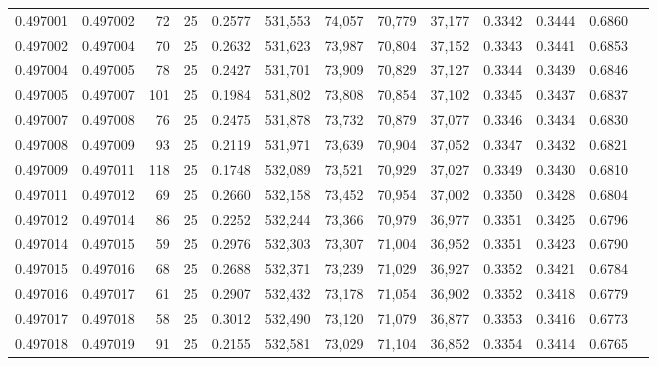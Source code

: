\begin{tabular}{rrrrrrrrrrrrr}
0.497001 & 0.497002 &    72 &  25 &                                     0.2577 & 531,553 &  74,057 &  70,779 &  37,177 & 0.3342 & 0.3444 & 0.6860 \\
0.497002 & 0.497004 &    70 &  25 &                                     0.2632 & 531,623 &  73,987 &  70,804 &  37,152 & 0.3343 & 0.3441 & 0.6853 \\
0.497004 & 0.497005 &    78 &  25 &                                     0.2427 & 531,701 &  73,909 &  70,829 &  37,127 & 0.3344 & 0.3439 & 0.6846 \\
0.497005 & 0.497007 &   101 &  25 &                                     0.1984 & 531,802 &  73,808 &  70,854 &  37,102 & 0.3345 & 0.3437 & 0.6837 \\
0.497007 & 0.497008 &    76 &  25 &                                     0.2475 & 531,878 &  73,732 &  70,879 &  37,077 & 0.3346 & 0.3434 & 0.6830 \\
0.497008 & 0.497009 &    93 &  25 &                                     0.2119 & 531,971 &  73,639 &  70,904 &  37,052 & 0.3347 & 0.3432 & 0.6821 \\
0.497009 & 0.497011 &   118 &  25 &                                     0.1748 & 532,089 &  73,521 &  70,929 &  37,027 & 0.3349 & 0.3430 & 0.6810 \\
0.497011 & 0.497012 &    69 &  25 &                                     0.2660 & 532,158 &  73,452 &  70,954 &  37,002 & 0.3350 & 0.3428 & 0.6804 \\
0.497012 & 0.497014 &    86 &  25 &                                     0.2252 & 532,244 &  73,366 &  70,979 &  36,977 & 0.3351 & 0.3425 & 0.6796 \\
0.497014 & 0.497015 &    59 &  25 &                                     0.2976 & 532,303 &  73,307 &  71,004 &  36,952 & 0.3351 & 0.3423 & 0.6790 \\
0.497015 & 0.497016 &    68 &  25 &                                     0.2688 & 532,371 &  73,239 &  71,029 &  36,927 & 0.3352 & 0.3421 & 0.6784 \\
0.497016 & 0.497017 &    61 &  25 &                                     0.2907 & 532,432 &  73,178 &  71,054 &  36,902 & 0.3352 & 0.3418 & 0.6779 \\
0.497017 & 0.497018 &    58 &  25 &                                     0.3012 & 532,490 &  73,120 &  71,079 &  36,877 & 0.3353 & 0.3416 & 0.6773 \\
0.497018 & 0.497019 &    91 &  25 &                                     0.2155 & 532,581 &  73,029 &  71,104 &  36,852 & 0.3354 & 0.3414 & 0.6765 \\

\end{tabular}
